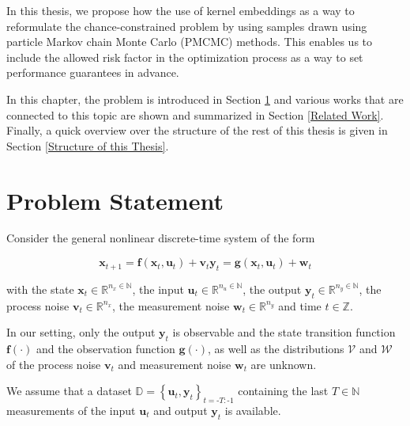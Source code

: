 In this thesis, we propose how the use of kernel embeddings \cite{Yassine_22} as a way to reformulate the chance-constrained problem by using samples drawn using particle Markov chain Monte Carlo (PMCMC) methods. This enables us to include the allowed risk factor in the optimization process as a way to set performance guarantees in advance.

In this chapter, the problem is introduced in Section \ref{Problem Statement} and various works that are connected to this topic are shown and summarized in Section \ref{Related Work}. Finally, a quick overview over the structure of the rest of this thesis is given in Section \ref{Structure of this Thesis}.

\section{Problem Statement} \label{Problem Statement}

Consider the general nonlinear discrete-time system of the form

\begin{subequations} \label{System equation}
\begin{equation}
\boldsymbol{x}_{t+1} = \boldsymbol{f} \left( \boldsymbol{x}_{t}, \boldsymbol{u}_t \right) + \boldsymbol{v}_{t}
\end{equation}
\begin{equation}
\boldsymbol{y}_{t} = \boldsymbol{g} \left( \boldsymbol{x}_{t}, \boldsymbol{u}_t \right) + \boldsymbol{w}_{t}
\end{equation}
\end{subequations}

with the state $\boldsymbol{x}_t \in \mathbb{R}^{n_x \in \mathbb{N}}$, the input $\boldsymbol{u}_t \in \mathbb{R}^{n_u \in \mathbb{N}}$, the output $\boldsymbol{y}_t \in \mathbb{R}^{n_y \in \mathbb{N}}$, the process noise $\boldsymbol{v}_{t} \in \mathbb{R}^{n_x}$, the measurement noise $\boldsymbol{w}_{t} \in \mathbb{R}^{n_y}$ and time $t \in \mathbb{Z}$. 

In our setting, only the output $\boldsymbol{y}_t$ is observable and the state transition function $\boldsymbol{f}(\cdot)$ and the observation function $\boldsymbol{g}(\cdot)$, as well as the distributions $\boldsymbol{\mathcal{V}}$ and $\boldsymbol{\mathcal{W}}$ of the process noise $\boldsymbol{v}_t$ and measurement noise $\boldsymbol{w}_t$ are unknown.

We assume that a dataset $\mathbb{D} = \left\{\boldsymbol{u}_{t}, \boldsymbol{y}_{t}\right\}_{t = \text{-}T:\text{-}1}$ containing the last $T \in \mathbb{N}$ measurements of the input $\boldsymbol{u}_t$ and output $\boldsymbol{y}_t$ is available.

